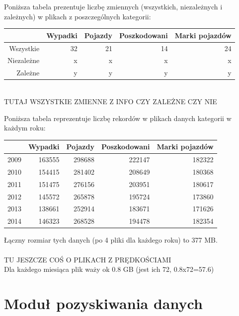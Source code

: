 \documentclass{article}
\begin{document}
Poniższa tabela prezentuje liczbę zmiennych (wszystkich, niezależnych i zależnych) w plikach z poszczególnych kategorii:\\

\begin{tabular}{|r|r|r|r|r|}
  \hline 
    & Wypadki & Pojazdy & Poszkodowani & Marki pojazdów\\
  \hline 
  Wszystkie & 32 & 21 & 14 & 24\\
  \hline
  Niezależne & x & x & x & x\\
  \hline
  Zależne & y & y & y & y\\
  \hline
\end{tabular} \\

TUTAJ WSZYSTKIE ZMIENNE Z INFO CZY ZALEŻNE CZY NIE


Poniższa tabela reprezentuje liczbę rekordów w plikach danych kategorii w każdym roku:\\

\begin{tabular}{|r|r|r|r|r|}
  \hline 
    & Wypadki & Pojazdy & Poszkodowani & Marki pojazdów\\
  \hline 
  2009 & 163555 & 298688 & 222147 & 182322\\
  \hline
  2010 & 154415 & 281402 & 208649 & 180368\\
  \hline
  2011 & 151475 & 276156 & 203951 & 180617\\
  \hline
  2012 & 145572 & 265878 & 195724 & 173860\\
  \hline
  2013 & 138661 & 252914 & 183671 & 171626\\
  \hline
  2014 & 146323 & 268528 & 194478 & 182354\\
  \hline
\end{tabular} 

Łączny rozmiar tych danych (po 4 pliki dla każdego roku) to 377 MB.\\\\

TU JESZCZE COŚ O PLIKACH Z PRĘDKOŚCIAMI\\
Dla każdego miesiąca plik waży ok 0.8 GB (jest ich 72, 0.8x72=57.6)


\section{Moduł pozyskiwania danych}
\end{document}
